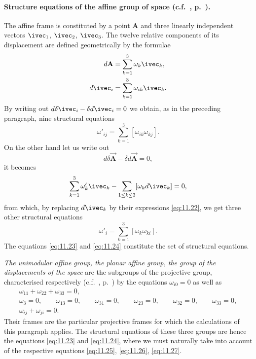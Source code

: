 \paragraph[{Structure equations of the affine group of space.}]{Structure equations of the affine group of space (c.f.~, p.~\pageref{sec:72}).}
\label{sec:160}
The affine frame is constituted by a point $\mathbf{A}$ and three linearly independent vectors $\ivec_{1}$, $\ivec_{2}$, $\ivec_{3}$. The twelve relative components of its displacement are defined geometrically by the formulae
\begin{align}
  \label{eq:11.21}
  d\mathbf{A}&=\sum_{k=1}^{3}\omega_{k}\ivec_{k},\\
  \label{eq:11.22}
  d\ivec_{i}&=\sum_{k=1}^{3}\omega_{ik}\ivec_{k}.
\end{align}
By writing out $d\delta\ivec_{i}-\delta d\ivec_{i}=0$ we obtain, as in the preceding paragraph, nine structural equations
\begin{equation}
  \label{eq:11.23}
  \omega'_{ij}=\sum_{k=1}^{3}[\omega_{ik}\omega_{kj}].
\end{equation}
On the other hand let us write out
\[
d\delta\vec{\mathbf{A}}-\delta d\vec{\mathbf{A}}=0,
\]
it becomes
\[
\sum_{k=1}^{3}\omega'_{k}\ivec_{k}-\sum_{1\le k\le 3}[\omega_{k}d\ivec_{k}]=0,
\]
from which, by replacing $d\ivec_{k}$ by their expressions \eqref{eq:11.22}, we get three other structural equations
\begin{equation}
  \label{eq:11.24}
  \omega'_{i}=\sum_{k=1}^{3}[\omega_{k}\omega_{ki}].
\end{equation}
The equations \eqref{eq:11.23} and \eqref{eq:11.24} constitute the set of structural equations.

\emph{The unimodular affine group, the planar affine group, the group of the displacements of the space} are the subgroups of the projective group, characterised respectively (c.f.~, p.~\pageref{sec:125}) by the equations $\omega_{i0}=0$ as well as
\begin{gather}
  \label{eq:11.25}
  \omega_{11}+\omega_{22}+\omega_{33}=0,\\
  \label{eq:11.26}
  \omega_{3}=0,\qquad\omega_{13}=0,\qquad\omega_{31}=0,\qquad\omega_{23}=0,\qquad\omega_{32}=0,\qquad\omega_{33}=0,\\
  \label{eq:11.27}
  \omega_{ij}+\omega_{ji}=0.
\end{gather}
Their frames are the particular projective frames for which the calculations of this paragraph applies. The structural equations of these three groups are hence the equations \eqref{eq:11.23} and \eqref{eq:11.24}, where we must naturally take into account of the respective equations \eqref{eq:11.25}, \eqref{eq:11.26}, \eqref{eq:11.27}.


